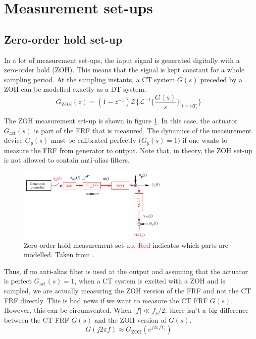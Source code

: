 \newpage
\section{Measurement set-ups}
\subsection{Zero-order hold set-up}
In a lot of measurement set-ups, the input signal is generated digitally with a zero-order hold (ZOH). This means that the signal is kept constant for a whole sampling period. At the sampling instants, a CT system $G(s)$ preceded by a ZOH can be modelled exactly as a DT system. \cite[eq. (34)]{ZOH_reference}
\begin{equation}
    G_{\mathrm{ZOH}}(z) = (1-z^{-1})  \mathcal{Z}\Big\{\mathcal{L}^{-1}\big\{\frac{G(s)}{s} \big\}\rvert_{t=n T_s}\Big\}
    \label{eq:ZOH_transform}
\end{equation}

The ZOH measurement set-up is shown in figure \ref{fig:zoh_setup}. In this case, the actuator $G_\mathrm{act}(s)$ is part of the FRF that is measured. The dynamics of the measurement device $G_y(s)$ must be calibrated perfectly ($G_y(s)=1)$ if one wants to measure the FRF from generator to output. Note that, in theory, the ZOH set-up is not allowed to contain anti-alias filters.
\begin{figure}[H]
    \centering
    \includegraphics[width =0.65\textwidth]{figures/ZOH_setup.png}
    \caption{Zero-order hold measurement set-up. \textcolor{red}{Red} indicates which parts are modelled. Taken from \cite{identification_of_dynamical_sytems_slides}.}
    \label{fig:zoh_setup}
\end{figure}
Thus, if no anti-alias filter is used at the output and assuming that the actuator is perfect $G_{\textrm{act}}(s)=1$, when a CT system is excited with a ZOH and is sampled, we are actually measuring the ZOH version of the FRF and not the CT FRF directly. This is bad news if we want to measure the CT FRF $G(s)$. However, this can be circumvented. When $|f| \ll f_s/2$, there isn't a big difference between the CT FRF $G(s)$ and the ZOH version of $G(s)$.
\begin{equation}
    G(j 2 \pi f) \approx G_{\mathrm{ZOH}}(e^{j 2 \pi f T_s})
    \label{eq:Gzohapprox}
\end{equation}

